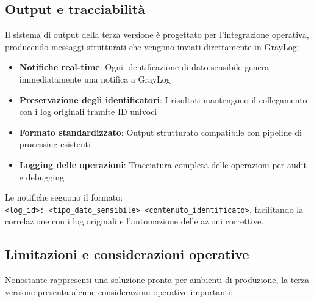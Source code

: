 \documentclass[12pt]{report}
\begin{document}
\subsection{Output e tracciabilità}
\label{subsec:ver3_output}

Il sistema di output della terza versione è progettato per l'integrazione operativa, producendo messaggi strutturati che vengono inviati direttamente in GrayLog:

\begin{itemize}
    \item \textbf{Notifiche real-time}: Ogni identificazione di dato sensibile genera immediatamente una notifica a GrayLog
    \item \textbf{Preservazione degli identificatori}: I risultati mantengono il collegamento con i log originali tramite ID univoci
    \item \textbf{Formato standardizzato}: Output strutturato compatibile con pipeline di processing esistenti
    \item \textbf{Logging delle operazioni}: Tracciatura completa delle operazioni per audit e debugging
\end{itemize}

Le notifiche seguono il formato: \\
\texttt{<log\_id>: <tipo\_dato\_sensibile> <contenuto\_identificato>}, facilitando la correlazione con i log originali e l'automazione delle azioni correttive.

\subsection{Limitazioni e considerazioni operative}
\label{subsec:ver3_limitazioni}

Nonostante rappresenti una soluzione pronta per ambienti di produzione, la terza versione presenta alcune considerazioni operative importanti:
\end{document}
